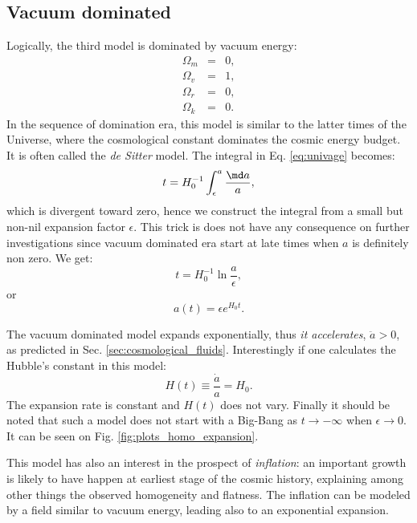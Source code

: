 \subsection{Vacuum dominated} %
\label{sub:vacuum_dominated}
Logically, the third model is dominated by vacuum energy:
\begin{eqnarray}
	\Omega_m&=&0,\\
	\Omega_v&=&1,\\
	\Omega_r&=&0,\\
	\Omega_k&=&0.
\end{eqnarray}
In the sequence of domination era, this model is similar to the latter times of the Universe, where the cosmological constant dominates the cosmic energy budget. It is often called the \emph{de Sitter} model. The integral in Eq. \ref{eq:univage} becomes:
\begin{equation}
	t=H_0^{-1}\int_\epsilon^a\frac{\md a}{a},
\end{equation}
which is divergent toward zero, hence we construct the integral from a small but non-nil expansion factor $\epsilon$. This trick is does not have any consequence on further investigations since vacuum dominated era start at late times when $a$ is definitely non zero. We get:
\begin{equation}
	t=H_0^{-1}\ln \frac{a}{\epsilon},
\end{equation}
or
\begin{equation}
	a(t)=\epsilon e^{H_0 t}.
\end{equation}

The vacuum dominated model expands exponentially, thus \emph{it accelerates}, $\ddot a >0$, as predicted in Sec. \ref{sec:cosmological_fluids}. Interestingly if one calculates the Hubble's constant in this model:
\begin{equation}
	H(t)\equiv \frac{\dot a}{a}=H_0.
\end{equation}
The expansion rate is constant and $H(t)$ does not vary. Finally it should be noted that such a model does not start with a Big-Bang as $t\rightarrow-\infty$ when $\epsilon \rightarrow 0$. It can be seen on Fig. \ref{fig:plots_homo_expansion}.

This model has also an interest in the prospect of \emph{inflation}: an important growth is likely to have happen at earliest stage of the cosmic history, explaining among other things the observed homogeneity and flatness. The inflation can be modeled by a field similar to vacuum energy, leading also to an exponential expansion. 

